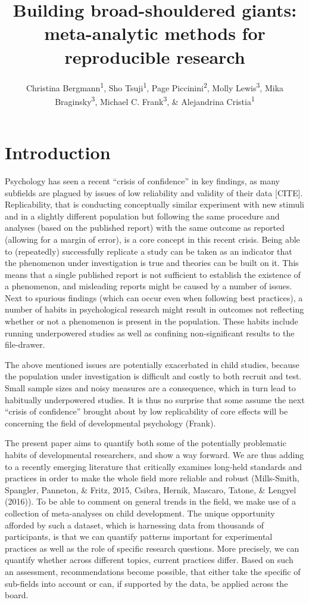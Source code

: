 \documentclass[english,floatsintext,man]{apa6}
\title{Building broad-shouldered giants: meta-analytic methods for reproducible
research}
\author{Christina Bergmann\textsuperscript{1}, Sho Tsuji\textsuperscript{1}, Page Piccinini\textsuperscript{2}, Molly Lewis\textsuperscript{3}, Mika Braginsky\textsuperscript{3}, Michael C. Frank\textsuperscript{3}, \& Alejandrina Cristia\textsuperscript{1}}
\affiliation{
    \vspace{0.5cm}
          \textsuperscript{1} Laboratoire de Sciences Cognitives et Psycholinguistique, ENS\\
          \textsuperscript{2} NeuroPsychologie Interventionnelle, ENS\\
          \textsuperscript{3} Department Psychology, Stanford University  }
\begin{document}
\maketitle



\section{Introduction}\label{introduction}

Psychology has seen a recent \enquote{crisis of confidence} in key
findings, as many subfields are plagued by issues of low reliability and
validity of their data {[}CITE{]}. Replicability, that is conducting
conceptually similar experiment with new stimuli and in a slightly
different population but following the same procedure and analyses
(based on the published report) with the same outcome as reported
(allowing for a margin of error), is a core concept in this recent
crisis. Being able to (repeatedly) successfully replicate a study can be
taken as an indicator that the phenomenon under investigation is true
and theories can be built on it. This means that a single published
report is not sufficient to establish the existence of a phenomenon, and
misleading reports might be caused by a number of issues. Next to
spurious findings (which can occur even when following best practices),
a number of habits in psychological research might result in outcomes
not reflecting whether or not a phenomenon is present in the population.
These habits include running underpowered studies as well as confining
non-significant results to the file-drawer.

The above mentioned issues are potentially exacerbated in child studies,
because the population under investigation is difficult and costly to
both recruit and test. Small sample sizes and noisy measures are a
consequence, which in turn lead to habitually underpowered studies. It
is thus no surprise that some assume the next \enquote{crisis of
confidence} brought about by low replicability of core effects will be
concerning the field of developmental psychology (Frank).

The present paper aims to quantify both some of the potentially
problematic habits of developmental researchers, and show a way forward.
We are thus adding to a recently emerging literature that critically
examines long-held standards and practices in order to make the whole
field more reliable and robust (Mills-Smith, Spangler, Panneton, \&
Fritz, 2015, Csibra, Hernik, Mascaro, Tatone, \& Lengyel (2016)). To be
able to comment on general trends in the field, we make use of a
collection of meta-analyses on child development. The unique opportunity
afforded by such a dataset, which is harnessing data from thousands of
participants, is that we can quantify patterns important for
experimental practices as well as the role of specific research
questions. More precisely, we can quantify whether across different
topics, current practices differ. Based on such an assessment,
recommendations become possible, that either take the specific of
sub-fields into account or can, if supported by the data, be applied
across the board.
\end{document}
